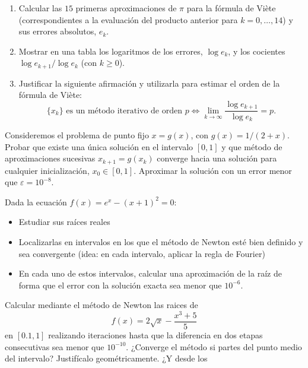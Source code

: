 \begin{problemas}
\begin{problema}
    \begin{enumerate}
    \item Calcular las $15$ primeras aproximaciones de $\pi$ para la
      fórmula de Viète (correspondientes a la evaluación del producto
      anterior para $k=0,\dots,14$) y sus errores absolutos, $e_k$.
    \item Mostrar en una tabla los logaritmos de los errores, $\log
      e_k$, y los cocientes $\log e_{k+1}/\log
      e_{k}$ (con $k\ge 0$).
    \item Justificar la siguiente afirmación y utilizarla para estimar
      el orden de la fórmula de Viète:
      \begin{equation*}
        \label{eq:1}
        \{x_k\} \text{ es un método iterativo de orden } p
        \Leftrightarrow \lim_{k\to\infty} \frac{\log e_{k+1}}{\log e_{k}}=p.
      \end{equation*}
    \end{enumerate}
  \end{problema}
  \begin{problema}
    Consideremos el problema de punto fijo $x=g(x)$, con
    $g(x)=1/(2+x)$.  Probar que existe una única solución en el
    intervalo $[0,1]$ y que método de aproximaciones sucesivas
    $x_{k+1}=g(x_k)$ converge hacia una solución para cualquier
    inicialización, $x_0\in[0,1]$. Aproximar la
    solución con un error menor que $\varepsilon=10^{-8}$.
  \end{problema}
  \begin{problema}
    Dada la ecuación $f(x)=e^x-(x+1)^2=0$:
    \begin{itemize}
    \item Estudiar sus raíces reales
    \item Localizarlas en intervalos en los que el método de Newton
      esté bien definido y sea convergente (idea: en cada intervalo,
      aplicar la regla de Fourier)
    \item En cada uno de estos intervalos, calcular una aproximación
      de la raíz de forma que el error con la solución exacta sea
      menor que $10^{-6}$.
    \end{itemize}
  \end{problema}
  \begin{problema}
    Calcular mediante el método de Newton las raices de
    $$f(x)=2\sqrt{x}-\frac{x^3+5}{5}$$ en $[0.1,1]$ realizando
    iteraciones hasta que la diferencia en dos etapas consecutivas sea
    menor que $10^{-10}$. ¿Converge el método si partes del punto
    medio del intervalo? Justifícalo geométricamente. ¿Y desde los

\end{problema}
\end{problemas}
